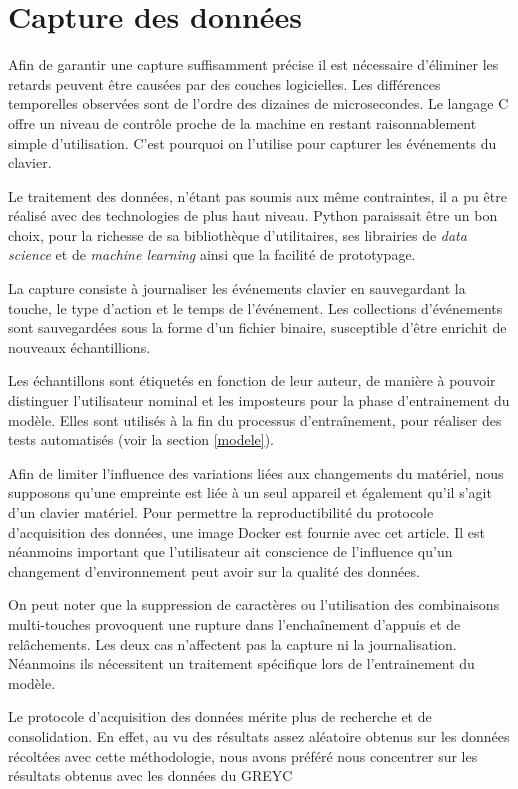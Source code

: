 \section{Capture des données}

Afin de garantir une capture suffisamment précise il est nécessaire d’éliminer les retards peuvent être causées par des couches logicielles. Les différences temporelles observées sont de l'ordre des dizaines de microsecondes. Le langage C offre un niveau de contrôle proche de la machine en restant raisonnablement simple d'utilisation. C'est pourquoi on l'utilise pour capturer les événements du clavier.

Le traitement des données, n’étant pas soumis aux même contraintes, il a pu être réalisé avec des technologies de plus haut niveau. Python paraissait être un bon choix, pour la richesse de sa bibliothèque d’utilitaires, ses librairies de \textit{data science} et de \textit{machine learning} ainsi que la facilité de prototypage.

La capture consiste à journaliser les événements clavier en sauvegardant la touche, le type d’action et le temps de l’événement. Les collections d’événements sont sauvegardées sous la forme d’un fichier binaire, susceptible d’être enrichit de nouveaux échantillions.

Les échantillons sont étiquetés en fonction de leur auteur, de manière à pouvoir distinguer l'utilisateur nominal et les imposteurs pour la phase d’entrainement du modèle. Elles sont utilisés à la fin du processus d’entraînement, pour réaliser des tests automatisés (voir la section \ref{modele}).

Afin de limiter l'influence des variations liées aux changements du matériel, nous supposons qu’une empreinte est liée à un seul appareil et également qu’il s’agit d’un clavier matériel. Pour permettre la reproductibilité du protocole d'acquisition des données, une image Docker est fournie avec cet article. Il est néanmoins important que l'utilisateur ait conscience de l'influence qu'un changement d'environnement peut avoir sur la qualité des données.

On peut noter que la suppression de caractères ou l'utilisation des combinaisons multi-touches provoquent une rupture dans l’enchaînement d’appuis et de relâchements. Les deux cas n'affectent pas la capture ni la journalisation. Néanmoins ils nécessitent un traitement spécifique lors de l'entrainement du modèle.

Le protocole d'acquisition des données mérite plus de recherche et de consolidation. En effet, au vu des résultats assez aléatoire obtenus sur les données récoltées avec cette méthodologie, nous avons préféré nous concentrer sur les résultats obtenus avec les données du GREYC

